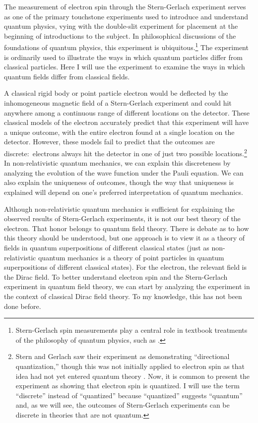 \documentclass[onecolumn,secnumarabic,amsmath,amssymb,balancelastpage,nofootinbib]{article}
\begin{document}
The measurement of electron spin through the Stern-Gerlach experiment serves as one of the primary touchstone experiments used to introduce and understand quantum physics, vying with the double-slit experiment for placement at the beginning of introductions to the subject.  In philosophical discussions of the foundations of quantum physics, this experiment is ubiquitous.\footnote{Stern-Gerlach spin measurements play a central role in textbook treatments of the philosophy of quantum physics, such as \citet{albertQM, lewisQM, norsen2017, maudlinQM, barrettQM}.\label{textbooks}}  The experiment is ordinarily used to illustrate the ways in which quantum particles differ from classical particles.  Here I will use the experiment to examine the ways in which quantum fields differ from classical fields.

A classical rigid body or point particle electron would be deflected by the inhomogeneous magnetic field of a Stern-Gerlach experiment and could hit anywhere among a continuous range of different locations on the detector.  These classical models of the electron accurately predict that this experiment will have a unique outcome, with the entire electron found at a single location on the detector.  However, these models fail to predict that the outcomes are discrete:\ electrons always hit the detector in one of just two possible locations.\footnote{Stern and Gerlach saw their experiment as demonstrating ``directional quantization,'' though this was not initially applied to electron spin as that idea had not yet entered quantum theory \citep{sterngerlach1922, weinert1995, sauer2016, schmidt2016}.  Now, it is common to present the experiment as showing that electron spin is quantized.  I will use the term ``discrete'' instead of ``quantized'' because ``quantized'' suggests ``quantum'' and, as we will see, the outcomes of Stern-Gerlach experiments can be discrete in theories that are not quantum.}  In non-relativistic quantum mechanics, we can explain this discreteness by analyzing the evolution of the wave function under the Pauli equation.  We can also explain the uniqueness of outcomes, though the way that uniqueness is explained will depend on one's preferred interpretation of quantum mechanics.

Although non-relativistic quantum mechanics is sufficient for explaining the observed results of Stern-Gerlach experiments, it is not our best theory of the electron.  That honor belongs to quantum field theory.  There is debate as to how this theory should be understood, but one approach is to view it as a theory of fields in quantum superpositions of different classical states (just as non-relativistic quantum mechanics is a theory of point particles in quantum superpositions of different classical states).  For the electron, the relevant field is the Dirac field.  To better understand electron spin and the Stern-Gerlach experiment in quantum field theory, we can start by analyzing the experiment in the context of classical Dirac field theory.  To my knowledge, this has not been done before.
\end{document}
